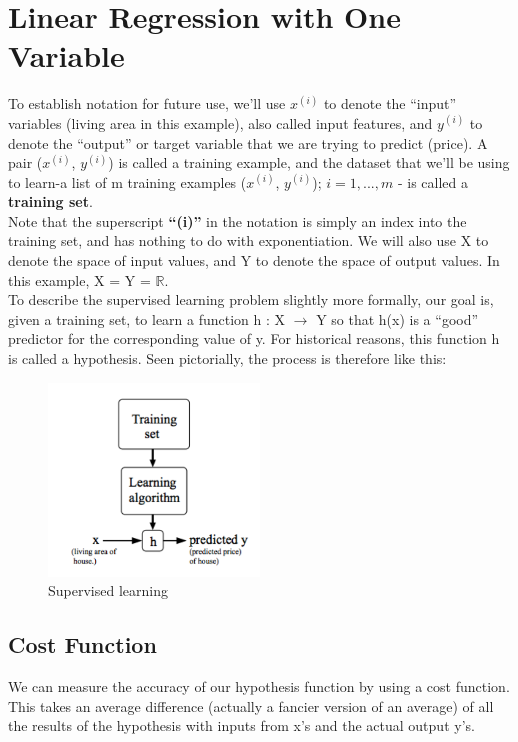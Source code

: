 \chapter{Linear Regression with One Variable}

To establish notation for future use, we’ll use $x^{(i)}$  to denote the “input” variables (living area in this example), also called input features, and $y^{(i)}$ to denote the “output” or target variable that we are trying to predict (price). A pair ($x^{(i)}$, $y^{(i)}$) is called a training example, and the dataset that we’ll be using to learn-a list of m training examples ($x^{(i)}$, $y^{(i)}$); $i=1,...,m$ - is called a\textbf{ training set}. \\

Note that the superscript \textbf{“(i)”} in the notation is simply an index into the training set, and has nothing to do with exponentiation. We will also use X to denote the space of input values, and Y to denote the space of output values. In this example, X = Y = $\mathbb{R}$.\\

To describe the supervised learning problem slightly more formally, our goal is, given a training set, to learn a function h : X $\rightarrow$ Y so that h(x) is a “good” predictor for the corresponding value of y. For historical reasons, this function h is called a hypothesis. Seen pictorially, the process is therefore like this:

\begin{figure}[h!]
	\centering
	\includegraphics[width=0.5\textwidth]{fig/sl}
	\caption{Supervised learning}
\end{figure}

\section{Cost Function}

We can measure the accuracy of our hypothesis function by using a cost function. This takes an average difference (actually a fancier version of an average) of all the results of the hypothesis with inputs from x's and the actual output y's.

